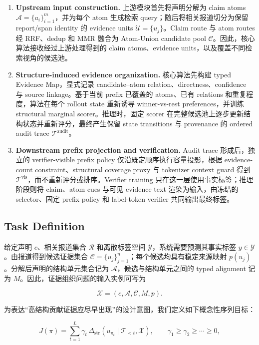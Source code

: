 \documentclass[letterpaper]{article}
\begin{document}
\begin{enumerate}
\item \textbf{Upstream input construction.} 上游模块首先将声明分解为 claim atoms $\mathcal A=\{a_i\}_{i=1}^{m}$，并为每个 atom 生成检索 query；随后将相关报道切分为保留 report/span identity 的 evidence units $\mathcal U=\{u_j\}$。Claim route 与 atom routes 经 RRF、dedup 和 MMR 融合为 Atom-Union candidate pool $\mathcal C$。因此，核心算法接收经过上游处理得到的 claim atoms、evidence units，以及覆盖不同检索视角的候选池。
\item \textbf{Structure-induced evidence organization.} 核心算法先构建 typed Evidence Map，显式记录 candidate--atom relation、directness、confidence 与 source linkage。基于当前 prefix 已覆盖的 atoms、已有 relations 和重复程度，算法在每个 rollout state 重新诱导 winner-vs-rest preferences，并训练 structural marginal scorer。推理时，固定 scorer 在完整候选池上逐步更新结构状态并重新评分，最终产生保留 state transitions 与 provenance 的 ordered audit trace $\mathcal T^{\mathrm{audit}}$。
\item \textbf{Downstream prefix projection and verification.} Audit trace 形成后，独立的 verifier-visible prefix policy 仅沿既定顺序执行容量投影，根据 evidence-count constraint、structural coverage proxy 与 tokenizer context guard 得到 $\mathcal T^{\mathrm{vis}}$，而不重新评分或排序。Verifier training 只在这一层使用事实标签；推理阶段则将 claim、atom cues 与可见 evidence text 渲染为输入，由冻结的 selector、固定 prefix policy 和 label-token verifier 共同输出最终标签。
\end{enumerate}

\subsection{Task Definition}

给定声明 $c$、相关报道集合 $\mathcal R$ 和离散标签空间 $\mathcal Y$，系统需要预测其事实标签 $y\in\mathcal Y$。由报道得到候选证据集合 $\mathcal C=\{u_j\}_{j=1}^{n}$；每个候选均具有稳定来源映射 $p(u_j)$。分解后声明的结构单元集合记为 $\mathcal A$，候选与结构单元之间的 typed alignment 记为 $M$。因此，证据组织问题的输入实例可写为

\[
\mathcal X=(c,\mathcal A,\mathcal C,M,p).
\]

为表达“高结构贡献证据应尽早出现”的设计意图，我们定义如下概念性序列目标：

\[
J(\pi)
=\sum_{t=1}^{L}\gamma_t\,
\Delta_{\mathrm{str}}\!\left(u_{\pi_t}\mid \mathcal T_{<t},\mathcal X\right),
\qquad \gamma_1\ge\gamma_2\ge\cdots\ge 0,
\]
\end{document}
